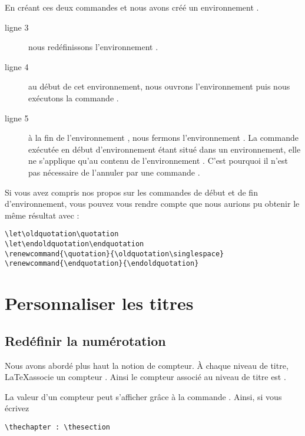 En créant ces deux commandes  et  nous avons créé un environnement .

\begin{description}
\item[ligne 3]nous redéfinissons l'environnement .
\item[ligne 4]au début de cet environnement, nous ouvrons l'environnement  puis nous exécutons la commande .
\item[ligne 5]à la fin de l'environnement , nous fermons l'environnement . La commande  exécutée en début d'environnement étant situé dans un environnement, elle ne s'applique qu'au contenu de l'environnement . C'est pourquoi il n'est pas nécessaire de l'annuler par une commande . 
\end{description}

\begin{plusloins}
Si vous avez compris nos propos sur les commandes de début et de fin d'environnement, vous pouvez vous rendre compte que nous aurions pu obtenir le même résultat avec :
\begin{verbatim}
\let\oldquotation\quotation
\let\endoldquotation\endquotation
\renewcommand{\quotation}{\oldquotation\singlespace}
\renewcommand{\endquotation}{\endoldquotation}
\end{verbatim}
\end{plusloins}

\section{Personnaliser les titres}

\subsection{Redéfinir la numérotation}\label{apparencecompteur}
Nous avons abordé plus haut la notion de compteur. À chaque niveau de titre, \LaTeX associe un compteur . Ainsi le compteur associé au niveau de titre  est .

La valeur d'un compteur peut s'afficher grâce à la commande . Ainsi, si vous écrivez 
\begin{verbatim}
\thechapter : \thesection
\end{verbatim}

